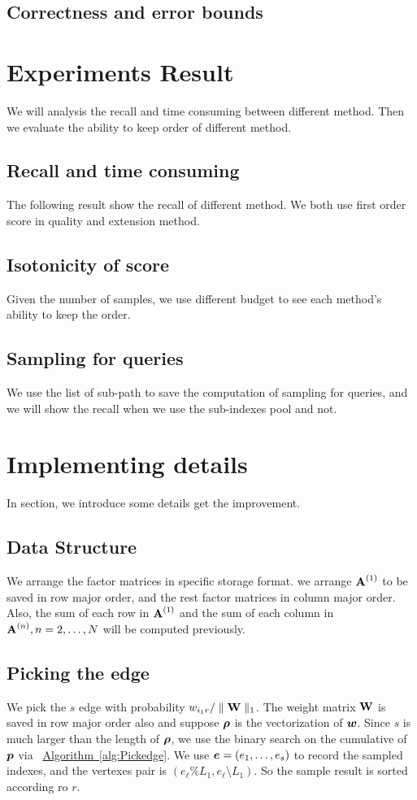 \documentclass{article}
\newcommand{\V}[1]{{\bm{{\MakeLowercase{#1}}}}}%
\newcommand{\M}[1]{{\bm{\mathbf{\MakeUppercase{#1}}}}}%
\newcommand{\Mn}[2]{\M{#1}^{(#2)}}%
\newcommand{\norm}[2]{\parallel#1\parallel_{#2}}
\newcommand{\Alg}[1]{\hyperref[alg:#1]{Algorithm~\ref*{alg:#1}}}
\begin{document}
\subsection{Correctness and error bounds}

\section{Experiments Result}
We will analysis the recall and time consuming  between different method. Then we evaluate the ability to keep order of different method.
\subsection{Recall and time consuming}
The following result show the recall of different method. We both use first order score in quality and extension method.

\subsection{Isotonicity of score}
Given the number of samples, we use different budget to see each method's ability to keep the order.

\subsection{Sampling for queries}
We use the list of sub-path to save the computation of sampling for queries, and we will show the recall when we use the sub-indexes pool and not.

\section{Implementing details}
In section, we introduce some details get the improvement.
\subsection{Data Structure}
We arrange the factor matrices in specific storage format. we arrange $\Mn{A}{1}$ to be saved in row major order, and the rest factor matrices in column major order. Also, the sum of each row in $\Mn{A}{1}$ and the sum of each column in $\Mn{A}{n},n=2,\ldots,N$ will be computed previously.

\subsection{Picking the edge}
We pick the $s$ edge with probability  $w_{i_1r}/\norm{\M{W}}{1}$. The weight matrix $\M{W}$ is saved in row major order also and suppose $\V{\rho}$ is the vectorization of $\V{W}$. Since $s$ is much larger than the length of $\V{\rho}$, we use the binary search on the cumulative of $\V{p}$ via ~\Alg{Pickedge}. We use $\V{e}=(e_1,\ldots,e_s)$ to record the sampled indexes, and the vertexes pair is $(e_{\ell}\%L_1,e_{\ell}\setminus L_1)$. So the sample result is sorted according ro $r$.
\end{document}
